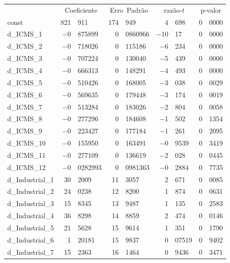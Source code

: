 \documentclass[11pt]{article}
\begin{document}
\begin{center}
\begin{tabular}{lr@{,}lr@{,}lr@{,}lr@{,}l}
  &
 \multicolumn{2}{c}{Coeficiente} &
  \multicolumn{2}{c}{Erro\ Padrão} &
   \multicolumn{2}{c}{razão-$t$} &
    \multicolumn{2}{c}{p-valor} \\[1ex]
const &
  821&911 &
    174&949 &
      4&698 &
        0&0000 \\
d\_ICMS\_1 &
  $-$0&875899 &
    0&0860966 &
      $-$10&17 &
        0&0000 \\
d\_ICMS\_2 &
  $-$0&718026 &
    0&115186 &
      $-$6&234 &
        0&0000 \\
d\_ICMS\_3 &
  $-$0&707224 &
    0&130040 &
      $-$5&439 &
        0&0000 \\
d\_ICMS\_4 &
  $-$0&666313 &
    0&148291 &
      $-$4&493 &
        0&0000 \\
d\_ICMS\_5 &
  $-$0&510426 &
    0&168005 &
      $-$3&038 &
        0&0029 \\
d\_ICMS\_6 &
  $-$0&569635 &
    0&179448 &
      $-$3&174 &
        0&0019 \\
d\_ICMS\_7 &
  $-$0&513284 &
    0&183026 &
      $-$2&804 &
        0&0058 \\
d\_ICMS\_8 &
  $-$0&277296 &
    0&184608 &
      $-$1&502 &
        0&1354 \\
d\_ICMS\_9 &
  $-$0&223427 &
    0&177184 &
      $-$1&261 &
        0&2095 \\
d\_ICMS\_10 &
  $-$0&155950 &
    0&163491 &
      $-$0&9539 &
        0&3419 \\
d\_ICMS\_11 &
  $-$0&277109 &
    0&136619 &
      $-$2&028 &
        0&0445 \\
d\_ICMS\_12 &
  $-$0&0282993 &
    0&0981363 &
      $-$0&2884 &
        0&7735 \\
d\_Industrial\_1 &
  30&2009 &
    11&3057 &
      2&671 &
        0&0085 \\
d\_Industrial\_2 &
  24&0238 &
    12&8200 &
      1&874 &
        0&0631 \\
d\_Industrial\_3 &
  15&8345 &
    13&9487 &
      1&135 &
        0&2583 \\
d\_Industrial\_4 &
  36&8298 &
    14&8859 &
      2&474 &
        0&0146 \\
d\_Industrial\_5 &
  21&5628 &
    15&9614 &
      1&351 &
        0&1790 \\
d\_Industrial\_6 &
  1&20181 &
    15&9837 &
      0&07519 &
        0&9402 \\
d\_Industrial\_7 &
  15&2363 &
    16&1464 &
      0&9436 &
        0&3471 \\

\end{tabular}
\end{center}
\end{document}

